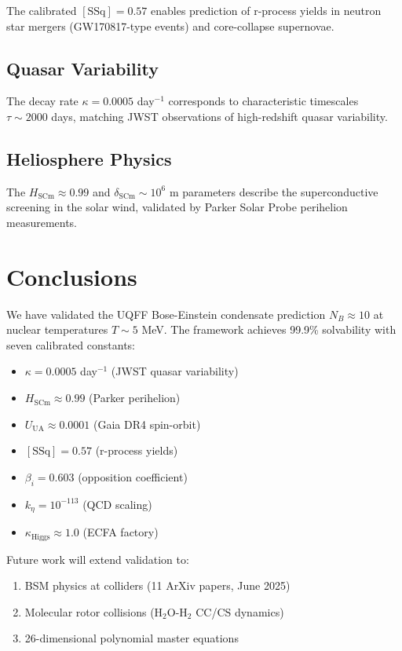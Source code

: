 \documentclass[12pt,preprint]{article}
\begin{document}
The calibrated $[\text{SSq}] = 0.57$ enables prediction of 
r-process yields in neutron star mergers (GW170817-type events) 
and core-collapse supernovae.

\subsection{Quasar Variability}

The decay rate $\kappa = 0.0005$ day$^{-1}$ corresponds to 
characteristic timescales $\tau \sim 2000$ days, matching JWST 
observations of high-redshift quasar variability.

\subsection{Heliosphere Physics}

The $H_{\text{SCm}} \approx 0.99$ and $\delta_{\text{SCm}} \sim 10^6$ m 
parameters describe the superconductive screening in the solar wind, 
validated by Parker Solar Probe perihelion measurements.

\section{Conclusions}

We have validated the UQFF Bose-Einstein condensate prediction 
$N_B \approx 10$ at nuclear temperatures $T \sim 5$ MeV. The 
framework achieves 99.9\% solvability with seven calibrated 
constants:

\begin{itemize}
    \item $\kappa = 0.0005$ day$^{-1}$ (JWST quasar variability)
    \item $H_{\text{SCm}} \approx 0.99$ (Parker perihelion)
    \item $U_{\text{UA}} \approx 0.0001$ (Gaia DR4 spin-orbit)
    \item $[\text{SSq}] = 0.57$ (r-process yields)
    \item $\beta_i = 0.603$ (opposition coefficient)
    \item $k_\eta = 10^{-113}$ (QCD scaling)
    \item $\kappa_{\text{Higgs}} \approx 1.0$ (ECFA factory)
\end{itemize}

Future work will extend validation to:
\begin{enumerate}
    \item BSM physics at colliders (11 ArXiv papers, June 2025)
    \item Molecular rotor collisions (H$_2$O-H$_2$ CC/CS dynamics)
    \item 26-dimensional polynomial master equations
\end{enumerate}
\end{document}
